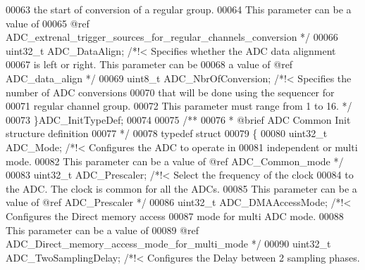 \begin{DoxyCode}
00063 \textcolor{comment}{                                               the start of conversion of a regular group.}
00064 \textcolor{comment}{                                               This parameter can be a value of }
00065 \textcolor{comment}{                                               @ref
       ADC\_extrenal\_trigger\_sources\_for\_regular\_channels\_conversion */}
00066   uint32\_t ADC_DataAlign;                 \textcolor{comment}{/*!< Specifies whether the ADC data  alignment}
00067 \textcolor{comment}{                                               is left or right. This parameter can be }
00068 \textcolor{comment}{                                               a value of @ref ADC\_data\_align */}
00069   uint8\_t  ADC_NbrOfConversion;           \textcolor{comment}{/*!< Specifies the number of ADC conversions}
00070 \textcolor{comment}{                                               that will be done using the sequencer for}
00071 \textcolor{comment}{                                               regular channel group.}
00072 \textcolor{comment}{                                               This parameter must range from 1 to 16. */}
00073 \}ADC\_InitTypeDef;
00074 
00075 \textcolor{comment}{/** }
00076 \textcolor{comment}{  * @brief   ADC Common Init structure definition  }
00077 \textcolor{comment}{  */}
00078 \textcolor{keyword}{typedef} \textcolor{keyword}{struct}
00079 \{
00080   uint32\_t ADC_Mode;                      \textcolor{comment}{/*!< Configures the ADC to operate in }
00081 \textcolor{comment}{                                               independent or multi mode. }
00082 \textcolor{comment}{                                               This parameter can be a value of @ref ADC\_Common\_mode
       */}
00083   uint32\_t ADC_Prescaler;                 \textcolor{comment}{/*!< Select the frequency of the clock }
00084 \textcolor{comment}{                                               to the ADC. The clock is common for all the ADCs.}
00085 \textcolor{comment}{                                               This parameter can be a value of @ref ADC\_Prescaler */}
00086   uint32\_t ADC_DMAAccessMode;             \textcolor{comment}{/*!< Configures the Direct memory access }
00087 \textcolor{comment}{                                              mode for multi ADC mode.}
00088 \textcolor{comment}{                                               This parameter can be a value of }
00089 \textcolor{comment}{                                               @ref ADC\_Direct\_memory\_access\_mode\_for\_multi\_mode */}
00090   uint32\_t ADC_TwoSamplingDelay;          \textcolor{comment}{/*!< Configures the Delay between 2 sampling phases.}

\end{DoxyCode}

